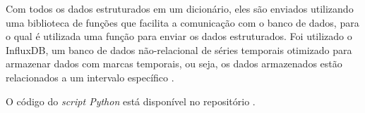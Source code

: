 Com todos os dados estruturados em um dicionário, eles são enviados utilizando uma biblioteca de funções que facilita a comunicação com o banco de dados, para o qual é utilizada uma função para enviar os dados estruturados. Foi utilizado o InfluxDB, um banco de dados não-relacional de séries temporais otimizado para armazenar dados com marcas temporais, ou seja, os dados armazenados estão relacionados a um intervalo específico \cite{influxData}.

O código do \emph{script Python} está disponível no repositório \cite{openmoteb-serialReader}.


